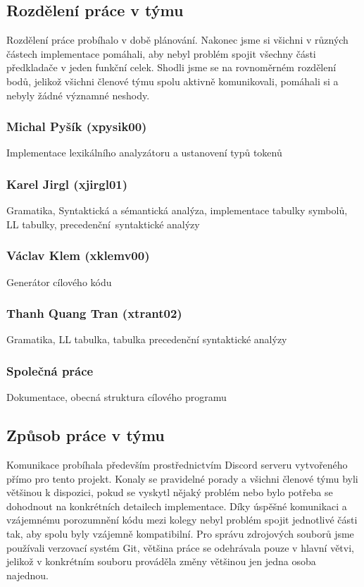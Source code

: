 \documentclass[a4paper, 12pt]{article}
\begin{document}
\subsection{Rozdělení práce v týmu}
Rozdělení práce probíhalo v době plánování. Nakonec jsme si všichni v různých částech implementace pomáhali, aby nebyl problém spojit všechny části předkladače v jeden funkční celek. Shodli jsme se na rovnoměrném rozdělení bodů, jelikož všichni členové týmu spolu aktivně komunikovali, pomáhali si a nebyly žádné významné neshody. 

\subsubsection*{Michal Pyšík (xpysik00)}
Implementace lexikálního analyzátoru a ustanovení typů tokenů

\subsubsection*{Karel Jirgl (xjirgl01)}
Gramatika, Syntaktická a sémantická analýza, implementace tabulky symbolů, LL tabulky, precedenční~syntaktické analýzy

\subsubsection*{Václav Klem (xklemv00) }
Generátor cílového kódu

\subsubsection*{Thanh Quang Tran (xtrant02)}
Gramatika, LL tabulka, tabulka precedenční syntaktické analýzy 

\subsubsection*{Společná práce}
Dokumentace, obecná struktura cílového programu

\subsection{Způsob práce v týmu}
Komunikace probíhala především prostřednictvím Discord serveru vytvořeného přímo pro tento projekt. Konaly se pravidelné porady a všichni členové týmu byli většinou k dispozici, pokud se vyskytl nějaký problém nebo bylo potřeba se dohodnout na konkrétních detailech implementace. Díky úspěšné komunikaci a vzájemnému porozumnění kódu mezi kolegy nebyl problém spojit jednotlivé části tak, aby spolu byly vzájemně kompatibilní. Pro správu zdrojových souborů jsme používali verzovací systém Git, většina práce se odehrávala pouze v hlavní větvi, jelikož v konkrétním souboru prováděla změny většinou jen jedna osoba najednou.
\end{document}
